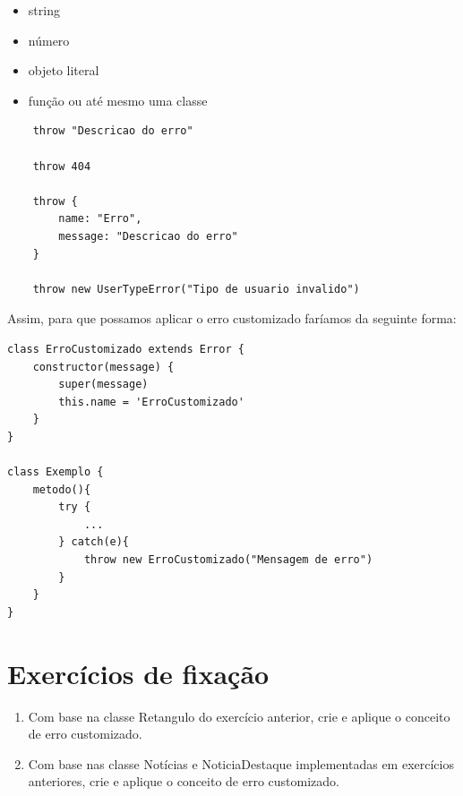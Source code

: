 \begin{itemize}
	\item string
	\item número
	\item objeto literal
	\item função ou até mesmo uma classe
\end{itemize}

\begin{verbatim}
	throw "Descricao do erro"
	
	throw 404
	
	throw {
		name: "Erro",
		message: "Descricao do erro"
	}
	
	throw new UserTypeError("Tipo de usuario invalido")
\end{verbatim}

Assim, para que possamos aplicar o erro customizado faríamos da seguinte forma: 

\begin{verbatim}
class ErroCustomizado extends Error {
	constructor(message) {
		super(message)
		this.name = 'ErroCustomizado'
	}
}

class Exemplo {
	metodo(){
		try {
			...	
		} catch(e){
			throw new ErroCustomizado("Mensagem de erro")	
		}
	}
}
\end{verbatim}

\section{Exercícios de fixação}

\begin{enumerate}
	\item Com base na classe Retangulo do exercício anterior, crie e aplique o conceito de erro customizado.
	\item Com base nas classe Notícias e NoticiaDestaque implementadas em exercícios anteriores, crie e aplique o conceito de erro customizado.
\end{enumerate}

